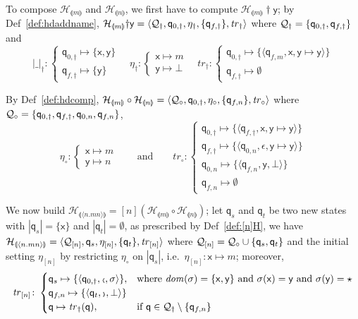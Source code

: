 \documentclass[runningheads,a4paper]{llncs}
\newcommand{\hdof}[1]{\mathcal H_{\nretohds{#1}}}
\newcommand{\nrebinder}[1]{\tuple{#1}}
\newcommand{\q}{\mathsf{q}}
\newcommand{\x}{\mathsf{x}}
\newcommand{\y}{\mathsf{y}}
\newcommand{\oscope}{\mbox{\tiny$\langle\!\!\langle$}}
\newcommand{\cscope}{\mbox{\tiny$\rangle\!\!\rangle$}}
\newcommand{\nretohds}[1]{\llparenthesis #1 \rrparenthesis}
\newcommand{\addname}[2]{#1 \dag  #2}
\newcommand{\trans}{\mathit{tr}}
\newcommand{\emptystr}{\epsilon}
\newcommand{\fresh}{\star}
\newcommand{\weight}[1]{|#1|}
\newcommand{\Q}{{\cal Q}}
\newcommand{\dom}[1]{\mathit{dom}(#1)}
\newcommand{\tuple}[1]{\langle#1\rangle}
\newcommand{\hdtr}[3]{\tuple{#2,#1,#3}}
\begin{document}
To compose $\hdof m$ and $\hdof n$, we first have to compute
$\addname{\hdof m} \y$; by Def~\ref{def:hdaddname},
$\addname{\hdof m} \y = \tuple{\Q_\dag,\q_{0,\dag},\eta_\dag,
  \{\q_{f,\dag}\}, \trans_\dag}$ where $\Q_\dag = \{\q_{0,\dag},
\q_{f,\dag}\}$ and
\[
\weight{\_}_\dag \colon
\begin{cases}
\q_{0,\dag} \mapsto \{\x,\y\}
\\
\q_{f,\dag} \mapsto \{\y\}  
\end{cases}
\quad
\eta_\dag \colon \begin{cases}
  \x \mapsto m
  \\
  \y \mapsto \bot
\end{cases}
\quad
\trans_\dag \colon \begin{cases}
 \q_{0,\dag} \mapsto \{\hdtr \x {\q_{f,m}} {\y\mapsto \y}\}
 \\
 \q_{f,\dag} \mapsto \emptyset
\end{cases}
\]

By Def~\ref{def:hdcomp}, $\hdof m \circ
\hdof n = \tuple{\Q_\circ, \q_{0,\dag}, \eta_\circ, \{\q_{f,n}\},
  \trans_\circ}$ where $\Q_\circ = \{\q_{0,\dag}, \q_{f,\dag}, \q_{0,n},
\q_{f,n}\}$,
\[
\eta_\circ \colon \begin{cases}
  \x \mapsto m
  \\
  \y \mapsto n
\end{cases}
\qquad\text{and}\qquad
\trans_\circ \colon \begin{cases}
  \q_{0,\dag} \mapsto \{ \hdtr \x {\q_{f,\dag}} {\y \mapsto \y} \}
  \\
  \q_{f,\dag} \mapsto \{\hdtr \emptystr {\q_{0,n}} {\y\mapsto \y}\}
  \\
  \q_{0,n} \mapsto \{\hdtr \y {\q_{f,n}} {\bot}\}
  \\
  \q_{f,n} \mapsto \emptyset
\end{cases}
\]

We now build $\hdof{\nrebinder{n.mn}} = [n](\hdof m \circ \hdof n)$; let
$\q_s$ and $\q_t$ be two new states with $\weight{\q_s} = \{\x\}$ and
$\weight{\q_t} = \emptyset$, as prescribed by Def~\ref{def:[n]H}, we
have $\hdof{\tuple{n.mn}} = \tuple{\Q_{[n]}, \q_s, \eta_{[n]}, \{\q_t\},
  \trans_{[n]}}$ where $\Q_{[n]} = \Q_\circ \cup \{\q_s, \q_t\}$ and
 the initial setting $\eta_{[n]}$ by restricting
$\eta_\circ$ on $\weight{\q_s}$, i.e.~$\eta_{[n]} \colon \x\mapsto m$;
moreover,
\[
\trans_{[n]} \colon
\begin{cases}
  \q_s \mapsto \{ \hdtr \oscope {\q_{0,\dag}} \sigma \}, & \text{where } \dom \sigma = \{\x,\y\} \text { and } \sigma(\x) = \y  \text { and } \sigma(\y) = \fresh
  \\
  \q_{f,n} \mapsto \{\hdtr \cscope {\q_t} \bot \}
  \\
  \q \mapsto \trans_\dag(\q), & \text{if } \q \in \Q_\dag \setminus \{\q_{f,n}\}
\end{cases}
\]
\end{document}
